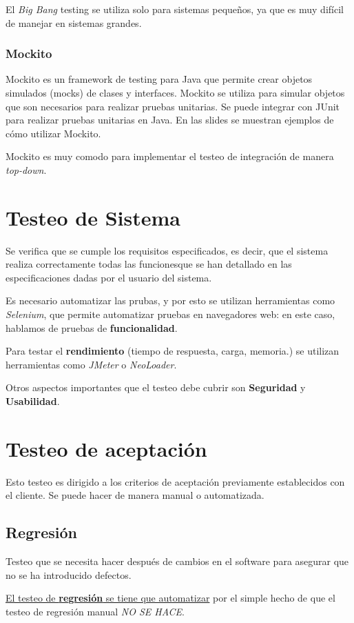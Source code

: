 El \textit{Big Bang} testing se utiliza solo para sistemas pequeños, ya que es muy difícil de manejar en sistemas grandes.


\subsubsection{Mockito}
Mockito es un framework de testing para Java que permite crear objetos simulados (mocks) de clases y interfaces. Mockito se utiliza para simular objetos que son necesarios para realizar pruebas unitarias. Se puede integrar con JUnit para realizar pruebas unitarias en Java. 
En las slides se muestran ejemplos de cómo utilizar Mockito.

Mockito es muy comodo para implementar el testeo de integración de manera \textit{top-down}.

\section{Testeo de Sistema}
Se verifica que se cumple los requisitos especificados, es decir, que el sistema realiza correctamente todas las funcionesque se han detallado en las especificaciones dadas por el usuario del sistema.

Es necesario automatizar las prubas, y por esto se utilizan herramientas como \textit{Selenium}, que permite automatizar pruebas en navegadores web: en este caso, hablamos de pruebas de \textbf{funcionalidad}.

Para testar el \textbf{rendimiento} (tiempo de respuesta, carga, memoria.) se utilizan herramientas como \textit{JMeter} o \textit{NeoLoader}.

Otros aspectos importantes que el testeo debe cubrir son \textbf{Seguridad} y \textbf{Usabilidad}.

\section{Testeo de aceptación}
Esto testeo es dirigido a los criterios de aceptación
previamente establecidos con el cliente. Se puede hacer de manera manual o automatizada.

\subsection{Regresión}
Testeo que se necesita hacer después de cambios en el
software para asegurar que no se ha introducido defectos.

\ul{El testeo de \textbf{regresión} se tiene que automatizar} por el simple hecho de que el testeo de regresión manual \textit{NO SE HACE}.

